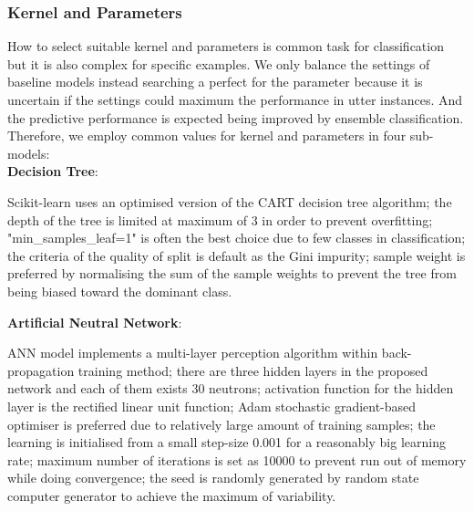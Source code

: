 \documentclass[12pt]{article}
\begin{document}
\subsubsection{Kernel and Parameters}
How to select suitable kernel and parameters is common task for classification but it is also complex for specific examples. We only balance the settings of baseline models instead searching a perfect for the parameter because it is uncertain if the settings could maximum the performance in utter instances. And the predictive performance is expected being improved by ensemble classification. Therefore, we employ common values for kernel and parameters in four sub-models:\\

\textbf{Decision Tree}:
		\begin{description} 
		\item \hspace{0.5cm} Scikit-learn uses an optimised version of the CART decision tree algorithm; 
		 the depth of the tree is limited at maximum of 3 in order to prevent overfitting; 
		 "min\_samples\_leaf=1" is often the best choice due to few classes in classification; 
		 the criteria of the quality of split is default as the Gini impurity; 
		 sample weight is preferred by normalising the sum of the sample weights to prevent the tree from being biased toward the dominant class.\\
		\end{description} 

	\textbf{Artificial Neutral Network}:
	\begin{description} 
		\item \hspace{0.5cm} ANN model implements a multi-layer perception algorithm within back-propagation training method; 
		 there are three hidden layers in the proposed network and each of them exists 30 neutrons;
		 activation function for the hidden layer is the rectified linear unit function; 
		 Adam stochastic gradient-based optimiser is preferred due to relatively large amount of training samples; 
		 the learning is initialised from a small step-size 0.001 for a reasonably big learning rate;	
		 maximum number of iterations is set as 10000 to prevent run out of memory while doing convergence; 
		 the seed is randomly generated by random state computer generator to achieve the maximum of variability.\\
	\end{description}
	
\end{document}
